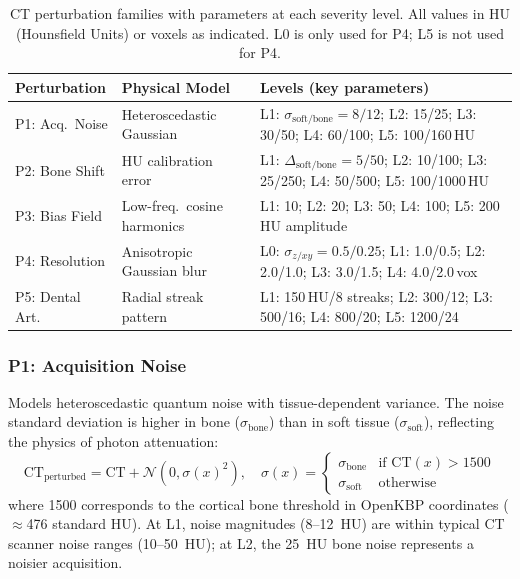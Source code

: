 \documentclass[11pt,a4paper]{article}
\begin{document}
\begin{table}[H]
\centering
\caption{CT perturbation families with parameters at each severity level. All values in HU (Hounsfield Units) or voxels as indicated. L0 is only used for P4; L5 is not used for P4.}
\label{tab:perturbations}
\small
\begin{tabularx}{\textwidth}{@{}l l X@{}}
\toprule
\textbf{Perturbation} & \textbf{Physical Model} & \textbf{Levels (key parameters)} \\
\midrule
P1: Acq.\ Noise & Heteroscedastic Gaussian & L1: $\sigma_\text{soft/bone}{=}8/12$; L2: 15/25; L3: 30/50; L4: 60/100; L5: 100/160\,HU \\[4pt]
P2: Bone Shift & HU calibration error & L1: $\Delta_\text{soft/bone}{=}5/50$; L2: 10/100; L3: 25/250; L4: 50/500; L5: 100/1000\,HU \\[4pt]
P3: Bias Field & Low-freq.\ cosine harmonics & L1: 10; L2: 20; L3: 50; L4: 100; L5: 200\,HU amplitude \\[4pt]
P4: Resolution & Anisotropic Gaussian blur & L0: $\sigma_{z/xy}{=}0.5/0.25$; L1: 1.0/0.5; L2: 2.0/1.0; L3: 3.0/1.5; L4: 4.0/2.0\,vox \\[4pt]
P5: Dental Art. & Radial streak pattern & L1: 150\,HU/8 streaks; L2: 300/12; L3: 500/16; L4: 800/20; L5: 1200/24 \\
\bottomrule
\end{tabularx}
\end{table}

\subsubsection{P1: Acquisition Noise}

Models heteroscedastic quantum noise with tissue-dependent variance. The noise standard deviation is higher in bone ($\sigma_\text{bone}$) than in soft tissue ($\sigma_\text{soft}$), reflecting the physics of photon attenuation:
\begin{equation}
\text{CT}_\text{perturbed} = \text{CT} + \mathcal{N}(0, \sigma(x)^2), \quad \sigma(x) = \begin{cases} \sigma_\text{bone} & \text{if CT}(x) > 1500 \\ \sigma_\text{soft} & \text{otherwise} \end{cases}
\end{equation}
where 1500 corresponds to the cortical bone threshold in OpenKBP coordinates ($\approx$476 standard HU). At L1, noise magnitudes (8--12~HU) are within typical CT scanner noise ranges (10--50~HU); at L2, the 25~HU bone noise represents a noisier acquisition.
\end{document}
